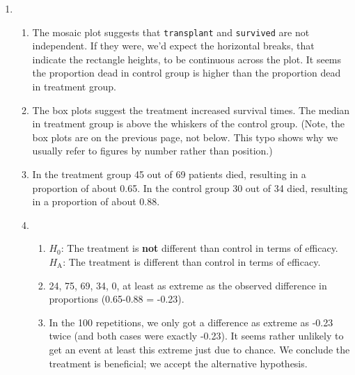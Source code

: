 \documentclass[12pt,letterpaper]{article}
\begin{document}
\begin{enumerate}
\item \begin{enumerate}
\item The mosaic plot suggests that \texttt{transplant} and \texttt{survived} are not independent. If they were, we'd expect the horizontal breaks, that indicate the rectangle heights, to be continuous across the plot. It seems the proportion dead in control group is higher than the proportion dead in treatment group.
\item The box plots suggest the treatment increased survival times. The median in treatment group is above the whiskers of the control group. 
 (Note, the box plots are on the previous page, not below. This typo shows why we usually refer to figures by number rather than position.)
\item In the treatment group 45 out of 69 patients died, resulting in a proportion of about 0.65. In the control group 30 out of 34 died, resulting in a proportion of about 0.88.
\item \begin{enumerate}
    \item $H_0$: The treatment is {\bf not} different than control in terms of efficacy.\\$H_\mathrm{A}$: The treatment is different than control in terms of efficacy.
    \item 24, 75, 69, 34, 0, at least as extreme as the observed difference in proportions (0.65-0.88 = -0.23).
    \item In the 100 repetitions, we only got a difference as extreme as -0.23 twice (and both cases were exactly -0.23). It seems rather unlikely to get an event at least this extreme just due to chance. We conclude the treatment is beneficial; we accept the alternative hypothesis.
\end{enumerate}
\end{enumerate}


\end{enumerate}
\end{document}
